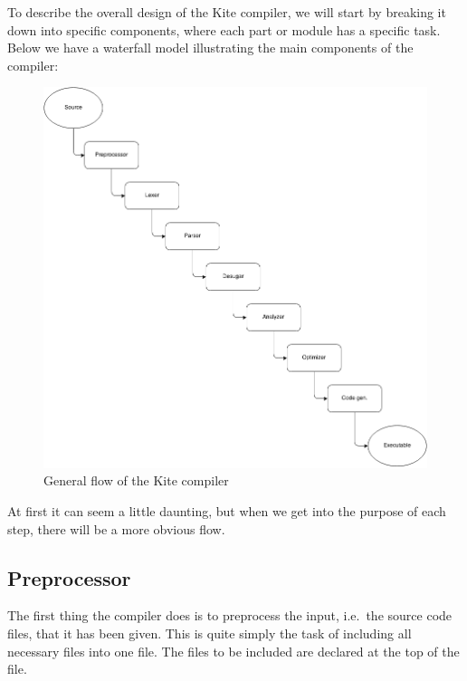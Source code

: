 
To describe the overall design of the Kite compiler, we will start by breaking it down into specific components, where each part or module has a specific task. Below we have a waterfall model illustrating the main components of the compiler:

\begin{figure}[H]
  \centering
  \includegraphics[scale=0.45]{images/flow.png}
  \caption{General flow of the Kite compiler}
\label{fig:flow}
\end{figure}

At first it can seem a little daunting, but when we get into the
purpose of each step, there will be a more obvious flow.

\newpage

\subsection{Preprocessor}
The first thing the compiler does is to preprocess the input, i.e.\ the source code files, that it has been given. This is quite simply the task of including all necessary files into one file. The files to be included are declared at the top of the file.

